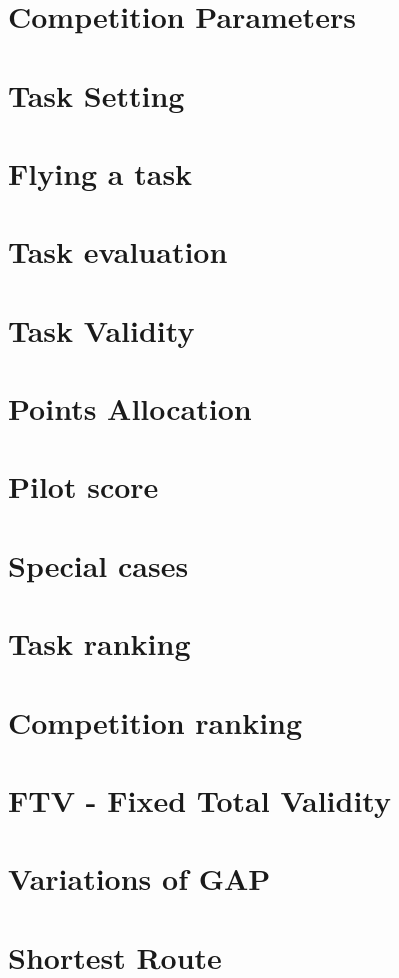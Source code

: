 \documentclass{article}
\begin{document}
\newpage
\section{Competition Parameters}


\newpage
\section{Task Setting}


\newpage
\section{Flying a task}


\newpage
\section{Task evaluation}


\newpage
\section{Task Validity}


\newpage
\section{Points Allocation}


\newpage
\section{Pilot score}


\newpage
\section{Special cases}


\newpage
\section{Task ranking}


\newpage
\section{Competition ranking}


\newpage
\section{FTV - Fixed Total Validity}


\newpage
\appendix

\section{Variations of GAP}


\section{Shortest Route}

\end{document}
